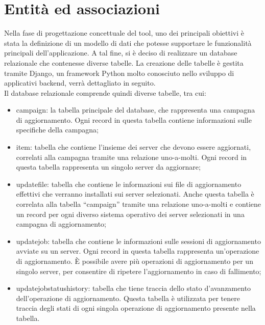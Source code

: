 \section{Entità ed associazioni}
Nella fase di progettazione concettuale del tool, uno dei principali
obiettivi è stata la definizione di un modello di dati che potesse 
supportare le funzionalità principali dell'applicazione.
A tal fine, si è deciso di realizzare un database relazionale che 
contenesse diverse tabelle. La creazione delle tabelle è gestita 
tramite Django, un framework Python molto conosciuto nello sviluppo di 
applicativi backend, verrà dettagliato in seguito.\\

\noindent Il database relazionale comprende quindi diverse tabelle, tra cui:
\begin{itemize}
\item campaign: la tabella principale del database, che rappresenta una 
campagna di aggiornamento. Ogni record in questa tabella contiene 
informazioni sulle specifiche della campagna;
\item item: tabella che contiene l'insieme dei server che devono essere 
aggiornati, correlati alla campagna tramite una relazione uno-a-molti. 
Ogni record in questa tabella rappresenta un singolo server da aggiornare;
\item updatefile: tabella che contiene le informazioni sui file di aggiornamento 
effettivi che verranno installati sui server selezionati. 
Anche questa tabella è correlata alla tabella “campaign” tramite una 
relazione uno-a-molti e contiene un record per ogni diverso sistema 
operativo dei server selezionati in una campagna di aggiornamento;
\item updatejob: tabella che contiene le informazioni sulle sessioni 
di aggiornamento avviate su un server. Ogni record in questa tabella 
rappresenta un'operazione di aggiornamento. È possibile avere più operazioni 
di aggiornamento per un singolo server, per consentire di ripetere 
l’aggiornamento in caso di fallimento;
\item updatejobstatushistory: tabella che tiene traccia dello stato d'avanzamento 
dell’operazione di aggiornamento. Questa tabella è utilizzata 
per tenere traccia degli stati di ogni singola operazione di aggiornamento 
presente nella tabella.
\end{itemize}

